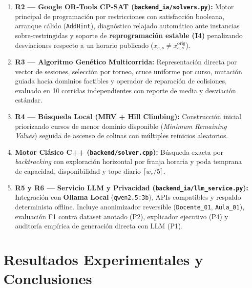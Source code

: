 \documentclass[11pt,letterpaper]{article}
\newcommand{\seccionUPV}[1]{%
    \section{\texorpdfstring{\textcolor{upvmorado}{#1}}{#1}}%
    \vspace{-0.22cm}{\color{upvnaranja}\rule{\textwidth}{1.1pt}}\vspace{0.12cm}%
}
\begin{document}
\begin{enumerate}
    \item \textbf{R2 --- Google OR-Tools CP-SAT (\texttt{backend\_ia/solvers.py}):} Motor principal de programación por restricciones con satisfacción booleana, arranque cálido (\texttt{AddHint}), diagnóstico relajado automático ante instancias sobre-restringidas y soporte de \textbf{reprogramación estable (I4)} penalizando desviaciones respecto a un horario publicado ($x_{c,s} \neq x^{\text{orig}}_{c,s}$).
    \item \textbf{R3 --- Algoritmo Genético Multicorrida:} Representación directa por vector de sesiones, selección por torneo, cruce uniforme por curso, mutación guiada hacia dominios factibles y operador de reparación de colisiones, evaluado en 10 corridas independientes con reporte de media y desviación estándar.
    \item \textbf{R4 --- Búsqueda Local (MRV + Hill Climbing):} Construcción inicial priorizando cursos de menor dominio disponible (\textit{Minimum Remaining Values}) seguida de ascenso de colinas con múltiples reinicios aleatorios.
    \item \textbf{Motor Clásico C++ (\texttt{backend/solver.cpp}):} Búsqueda exacta por \textit{backtracking} con exploración horizontal por franja horaria y poda temprana de capacidad, disponibilidad y tope diario $\lceil w_c / 5 \rceil$.
    \item \textbf{R5 y R6 --- Servicio LLM y Privacidad (\texttt{backend\_ia/llm\_service.py}):} Integración con \textbf{Ollama Local} (\texttt{qwen2.5:3b}), APIs compatibles y respaldo determinista offline. Incluye anonimizador reversible (\texttt{Docente\_01}, \texttt{Aula\_01}), evaluación F1 contra dataset anotado (P2), explicador ejecutivo (P4) y auditoría empírica de generación directa con LLM (P1).
\end{enumerate}

\seccionUPV{Resultados Experimentales y Conclusiones}
\end{document}
